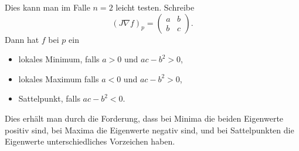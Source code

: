 \documentclass[../main.tex]{subfiles}
\begin{document}
Dies kann man im Falle $n = 2$ leicht testen. Schreibe
\[
  {(J \nabla f)}_p =
  \begin{pmatrix}
    a & b \\ b & c
  \end{pmatrix}.
\]
Dann hat $f$ bei $p$ ein
\begin{itemize}
  \item lokales Minimum, falls $a > 0$ und $ac - b^2 > 0$,
  \item lokales Maximum falls $a < 0$ und $ac - b^2 > 0$,
  \item Sattelpunkt, falls $ac - b^2 < 0$.
\end{itemize}
Dies erhält man durch die Forderung, dass bei Minima die
beiden Eigenwerte positiv sind, bei Maxima die Eigenwerte
negativ sind, und bei Sattelpunkten die Eigenwerte unterschiedliches
Vorzeichen haben.
\end{document}
